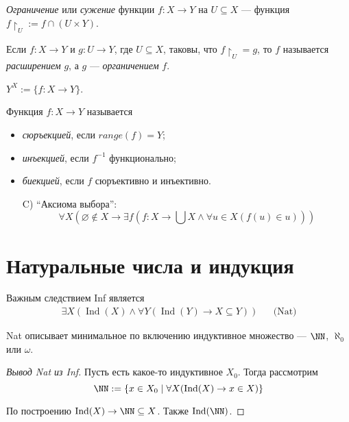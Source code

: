 \documentclass[12pt,a4paper]{article}
\DeclareMathOperator{\Ind}{Ind}
\begin{document}
    \begin{definition}
        \emph{Ограничение} или \emph{сужение} функции $f: X \to Y$ на $U \subseteq X$ --- функция $f\upharpoonright_U := f \cap (U \times Y)$.
        
        Если $f: X \to Y$ и $g: U \to Y$, где $U \subseteq X$, таковы, что $f\upharpoonright_U = g$, то $f$ называется \emph{расширением} $g$, а $g$ --- \emph{органичением} $f$.
    \end{definition}

    \begin{definition}
        $Y^X := \{f: X \to Y\}$.
    \end{definition}

    \begin{definition}
        Функция $f: X \to Y$ называется 
        \begin{itemize}
            \item \emph{сюръекцией},  если $range(f) = Y$;
            \item \emph{инъекцией}, если $f^{-1}$ функционально;
            \item \emph{биекцией}, если $f$ сюръективно и инъективно.
        \end{itemize}
    \end{definition}

    \begin{itemize}
        \item[C)] ``Аксиома выбора'':
            \[\forall X (\varnothing \notin X \to \exists f (f: X \to \bigcup X \wedge \forall u \in X (f(u) \in u)))\]
    \end{itemize}

    \section{Натуральные числа и индукция}

    Важным следствием Inf является
    \begin{align*}
        \exists X (\Ind(X) \wedge \forall Y (\Ind(Y) \to X \subseteq Y))&& \text{(Nat)}
    \end{align*}

    Nat описывает минимальное по включению индуктивное множество --- $\NN$, $\aleph_0$ или $\omega$.

    \begin{proof}[Вывод Nat из Inf]
        Пусть есть какое-то индуктивное $X_0$. Тогда рассмотрим
        \[\NN := \{x \in X_0 \mid \forall X (\Ind(X) \to x \in X)\}\]

        По построению $\Ind(X) \rightarrow \NN \subseteq X$. Также $\Ind(\NN)$.
    \end{proof}
\end{document}
